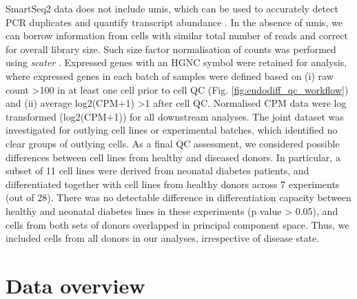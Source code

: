 SmartSeq2 data does not include \glspl{umi}, which can be used to accurately detect PCR duplicates and quantify transcript abundance \cite{smith2017umi, islam2014quantitative, kivioja2012counting}. 
In the absence of \glspl{umi}, we can borrow information from cells with similar total number of reads and correct for overall library size. 
Such size factor normalisation of counts was performed using \textit{scater} \cite{mccarthy2017scater}.
Expressed genes with an HGNC symbol were retained for analysis, where expressed genes in each batch of samples were defined based on (i) raw count >100 in at least one cell prior to cell QC (Fig. \ref{fig:endodiff_qc_workflow}) and (ii) average log2(CPM+1) >1 after cell QC. 
Normalised CPM data were log transformed (log2(CPM+1)) for all downstream analyses. 
The joint dataset was investigated for outlying cell lines or experimental batches, which identified no clear groups of outlying cells. 
As a final QC assessment, we considered possible differences between cell lines from healthy and diseased donors. 
In particular, a subset of 11 cell lines were derived from neonatal diabetes patients, and differentiated together with cell lines from healthy donors across 7 experiments (out of 28). 
There was no detectable difference in differentiation capacity between healthy and neonatal diabetes lines in these experiments (p value > 0.05), and cells from both sets of donors overlapped in principal component space. 
Thus, we included cells from all donors in our analyses, irrespective of disease state.


\newpage

\section{Data overview}
\label{sec:endodiff_overview}

